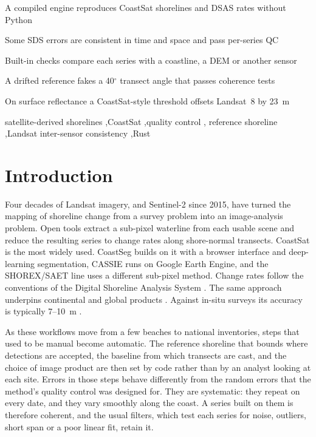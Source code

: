 \documentclass[authoryear,preprint,review,12pt]{elsarticle}
\begin{document}
\begin{frontmatter}
\begin{highlights}
\item A compiled engine reproduces CoastSat shorelines and DSAS rates without Python
\item Some SDS errors are consistent in time and space and pass per-series QC
\item Built-in checks compare each series with a coastline, a DEM or another sensor
\item A drifted reference fakes a 40$^\circ$ transect angle that passes coherence tests
\item On surface reflectance a CoastSat-style threshold offsets Landsat~8 by 23~m
\end{highlights}

\begin{keyword}
satellite-derived shorelines \sep CoastSat \sep quality control \sep
reference shoreline \sep Landsat inter-sensor consistency \sep Rust
\end{keyword}

\end{frontmatter}

\linenumbers

\section{Introduction}
Four decades of Landsat imagery, and Sentinel-2 since 2015, have turned the
mapping of shoreline change from a survey problem into an image-analysis
problem. Open tools extract a sub-pixel waterline from each usable scene and
reduce the resulting series to change rates along shore-normal transects.
CoastSat \citep{vos2019coastsat} is the most widely used. CoastSeg
\citep{fitzpatrick2024coastseg} builds on it with a browser interface and
deep-learning segmentation, CASSIE \citep{Almeida_2021_CASSIE} runs on Google
Earth Engine, and the SHOREX/SAET line
\citep{pardopascual2018shorex,palomarvazquez2023saet} uses a different sub-pixel
method. Change rates follow the conventions of the Digital Shoreline Analysis
System \citep{himmelstoss2018dsas,Himmelstoss_2021_DSAS}. The same approach
underpins continental and global products
\citep{Luijendijk_2018,BishopTaylor_2021}. Against in-situ surveys its accuracy
is typically 7--10~m \citep{hagenaars2018accuracy,vos2023benchmark}.

As these workflows move from a few beaches to national inventories, steps that
used to be manual become automatic. The reference shoreline that bounds where
detections are accepted, the baseline from which transects are cast, and the
choice of image product are then set by code rather than by an analyst looking
at each site. Errors in those steps behave differently from the random errors
that the method's quality control was designed for. They are systematic: they
repeat on every date, and they vary smoothly along the coast. A series built on
them is therefore coherent, and the usual filters, which test each series for
noise, outliers, short span or a poor linear fit, retain it.
\end{document}
